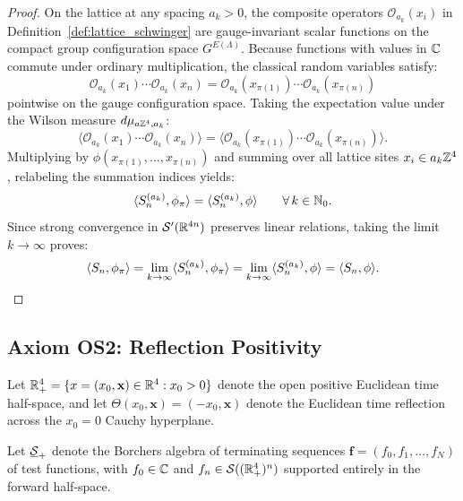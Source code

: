 \begin{proof}
On the lattice at any spacing $a_k > 0$, the composite operators $\mathcal{O}_{a_k}(x_i)$ in Definition~\ref{def:lattice_schwinger} are gauge-invariant scalar functions on the compact group configuration space $G^{E(\Lambda)}$. Because functions with values in $\mathbb{C}$ commute under ordinary multiplication, the classical random variables satisfy:
\begin{equation}
\mathcal{O}_{a_k}(x_1) \cdots \mathcal{O}_{a_k}(x_n) = \mathcal{O}_{a_k}(x_{\pi(1)}) \cdots \mathcal{O}_{a_k}(x_{\pi(n)})
\end{equation}
pointwise on the gauge configuration space. Taking the expectation value under the Wilson measure $d\mu_{a\mathbb{Z}^4, a_k}$:
\begin{equation}
\langle \mathcal{O}_{a_k}(x_1) \cdots \mathcal{O}_{a_k}(x_n) \rangle = \langle \mathcal{O}_{a_k}(x_{\pi(1)}) \cdots \mathcal{O}_{a_k}(x_{\pi(n)}) \rangle.
\end{equation}
Multiplying by $\phi(x_{\pi(1)}, \dots, x_{\pi(n)})$ and summing over all lattice sites $x_i \in a_k \mathbb{Z}^4$, relabeling the summation indices yields:
\begin{equation}
\langle S_n^{(a_k)}, \phi_\pi \rangle = \langle S_n^{(a_k)}, \phi \rangle \qquad \forall \, k \in \mathbb{N}_0.
\end{equation}
Since strong convergence in $\mathcal{S}'(\mathbb{R}^{4n})$ preserves linear relations, taking the limit $k \to \infty$ proves:
\begin{equation}
\langle S_n, \phi_\pi \rangle = \lim_{k \to \infty} \langle S_n^{(a_k)}, \phi_\pi \rangle = \lim_{k \to \infty} \langle S_n^{(a_k)}, \phi \rangle = \langle S_n, \phi \rangle. \qedhere
\end{equation}
\end{proof}

\subsection{Axiom OS2: Reflection Positivity}
\label{subsec:os2}

Let $\mathbb{R}^4_+ = \{x = (x_0, \mathbf{x}) \in \mathbb{R}^4 : x_0 > 0\}$ denote the open positive Euclidean time half-space, and let $\Theta(x_0, \mathbf{x}) = (-x_0, \mathbf{x})$ denote the Euclidean time reflection across the $x_0 = 0$ Cauchy hyperplane.

Let $\underline{\mathcal{S}}_+$ denote the Borchers algebra of terminating sequences $\mathbf{f} = (f_0, f_1, \dots, f_N)$ of test functions, with $f_0 \in \mathbb{C}$ and $f_n \in \mathcal{S}((\mathbb{R}^4_+)^n)$ supported entirely in the forward half-space.

